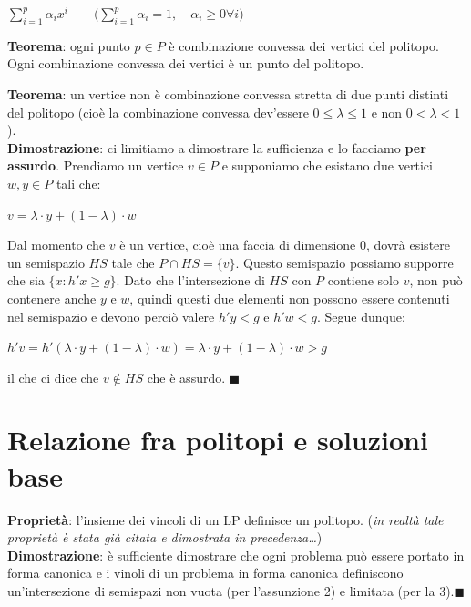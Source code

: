 \documentclass[11pt, oneside]{book}
\begin{document}
\begin{center}
$\sum\limits_{i=1}^p \alpha_i x^i \qquad \biggr(\sum\limits_{i=1}^p \alpha_i
  = 1, \quad \alpha_i \geq 0 \forall i\biggr)$  
\end{center}

\par\bigskip

{\bf Teorema}: ogni punto $p \in P$ \`e combinazione convessa dei
vertici del politopo. Ogni combinazione convessa dei vertici \`e un
punto del politopo.

\par\bigskip

{\bf Teorema}: un vertice non \`e combinazione convessa stretta di due
punti distinti del politopo (cio\`e la combinazione convessa
dev'essere $0\leq\lambda\leq1$ e non $0 < \lambda < 1$).\\
{\bf Dimostrazione}: ci limitiamo a dimostrare la sufficienza e lo
facciamo {\bf per assurdo}. Prendiamo un vertice $v \in P$ e
supponiamo che esistano due vertici $w,y \in P$ tali che:

\begin{center}
$v = \lambda\cdot y + (1-\lambda)\cdot w$  
\end{center}

Dal momento che $v$ \`e un vertice, cio\`e una faccia di dimensione 0,
dovr\`a esistere un semispazio $HS$ tale che $P \cap HS = \{ v
\}$. Questo semispazio possiamo supporre che sia $\{x : h'x \geq g
\}$. Dato che l'intersezione di $HS$ con $P$ contiene solo $v$, non
pu\`o contenere anche $y$ e $w$, quindi questi due elementi non
possono essere contenuti nel semispazio e devono perci\`o valere $h'y <
g$ e $h'w < g$. Segue dunque:

\begin{center}
$h'v = h'(\lambda\cdot y + (1-\lambda)\cdot w) = \lambda\cdot y +
  (1-\lambda)\cdot w > g$  
\end{center}

il che ci dice che $v \not\in HS$ che \`e assurdo. $\blacksquare$

\section{Relazione fra politopi e soluzioni base}

{\bf Propriet\`a}: l'insieme dei vincoli di un LP definisce un
politopo. \small({\em in realt\`a tale propriet\`a \`e stata gi\`a
  citata e dimostrata in precedenza\dots})\normalsize\\
{\bf Dimostrazione}: \`e sufficiente dimostrare che ogni problema
pu\`o essere portato in forma canonica e i vinoli di un problema in
forma canonica definiscono un'intersezione di semispazi non vuota (per
l'assunzione 2) e limitata (per la 3).$\blacksquare$
\end{document}
